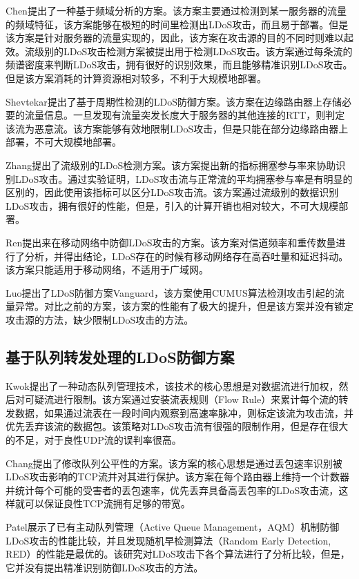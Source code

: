 Chen\cite{b3}提出了一种基于频域分析的方案。该方案主要通过检测到某一服务器的流量的频域特征，该方案能够在极短的时间里检测出LDoS攻击，而且易于部署。但是该方案是针对服务器的流量实现的，因此，该方案在攻击源的目的不同时则难以起效。流级别的LDoS攻击检测方案\cite{chen2007spectral}被提出用于检测LDoS攻击。该方案通过每条流的频谱密度来判断LDoS攻击，拥有很好的识别效果，而且能够精准识别LDoS攻击。但是该方案消耗的计算资源相对较多，不利于大规模地部署。

Shevtekar\cite{shevtekar2005low}提出了基于周期性检测的LDoS防御方案。该方案在边缘路由器上存储必要的流量信息。一旦发现有流量突发长度大于服务器的其他连接的RTT，则判定该流为恶意流。该方案能够有效地限制LDoS攻击，但是只能在部分边缘路由器上部署，不可大规模地部署。

Zhang\cite{b1}提出了流级别的LDoS检测方案。该方案提出新的指标拥塞参与率来协助识别LDoS攻击。通过实验证明，LDoS攻击流与正常流的平均拥塞参与率是有明显的区别的，因此使用该指标可以区分LDoS攻击流。该方案通过流级别的数据识别LDoS攻击，拥有很好的性能，但是，引入的计算开销也相对较大，不可大规模部署。

Ren\cite{ren2007pulsing}提出来在移动网络中防御LDoS攻击的方案。该方案对信道频率和重传数量进行了分析，并得出结论，LDoS存在的时候有移动网络存在高吞吐量和延迟抖动。该方案只能适用于移动网络，不适用于广域网。

Luo\cite{luo2009detecting}提出了LDoS防御方案Vanguard，该方案使用CUMUS算法检测攻击引起的流量异常。对比之前的方案，该方案的性能有了极大的提升，但是该方案并没有锁定攻击源的方法，缺少限制LDoS攻击的方法。

\subsection{基于队列转发处理的LDoS防御方案}
\label{chap2:queanalysis}
Kwok\cite{b22}提出了一种动态队列管理技术，该技术的核心思想是对数据流进行加权，然后对可疑流进行限制。该方案通过安装流表规则（Flow Rule）来累计每个流的转发数据，如果通过流表在一段时间内观察到高速率脉冲，则标定该流为攻击流，并优先丢弃该流的数据包。该策略对LDoS攻击流有很强的限制作用，但是存在很大的不足，对于良性UDP流的误判率很高。

Chang\cite{b8}提出了修改队列公平性的方案。该方案的核心思想是通过丢包速率识别被LDoS攻击影响的TCP流并对其进行保护。该方案在每个路由器上维持一个计数器并统计每个可能的受害者的丢包速率，优先丢弃具备高丢包率的LDoS攻击流，这样就可以保证良性TCP流拥有足够的带宽。

Patel\cite{patel2016throughput}展示了已有主动队列管理（Active Queue Management，AQM）机制防御LDoS攻击的性能比较，并且发现随机早检测算法（Random Early Detection, RED）的性能是最优的。该研究对LDoS攻击下各个算法进行了分析比较，但是，它并没有提出精准识别防御LDoS攻击的方法。


